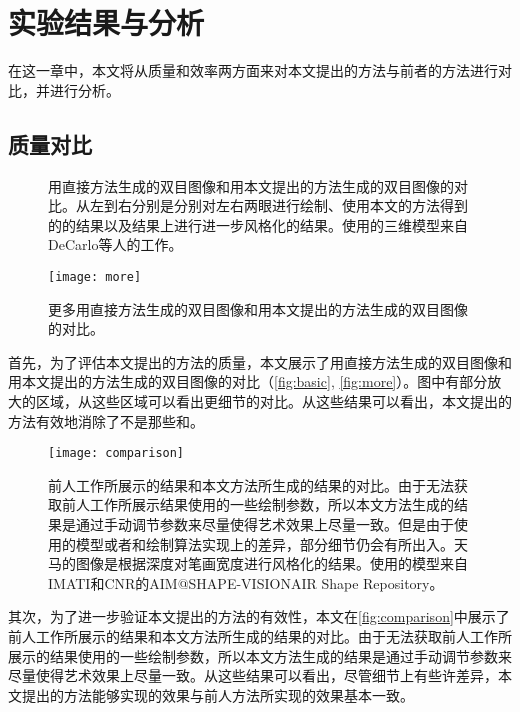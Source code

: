 \chapter{实验结果与分析}

在这一章中，本文将从质量和效率两方面来对本文提出的方法与前者的方法进行对比，并进行分析。

\section{质量对比}

\begin{figure}[tbh]
    \centering
    \caption[与直接方法的双目图像的对比]{\label{fig:basic}
    用直接方法生成的双目图像和用本文提出的方法生成的双目图像的对比。从左到右分别是分别对左右两眼进行绘制、使用本文的方法得到的\stc{}的结果以及\stc{}结果上进行进一步风格化的结果。使用的三维模型来自DeCarlo等人的工作\cite{DFRS03}。
    }
\end{figure}
  
\begin{figure}[tbh]
    \centering
    \texttt{[image: more]}
    \caption[更多与直接方法的双目图像的对比]{\label{fig:more}
    更多用直接方法生成的双目图像和用本文提出的方法生成的双目图像的对比。
    }
\end{figure}

首先，为了评估本文提出的方法的质量，本文展示了用直接方法生成的双目图像和用本文提出的方法生成的双目图像的对比（\autoref{fig:basic}, \autoref{fig:more}）。图中有部分放大的区域，从这些区域可以看出更细节的对比。从这些结果可以看出，本文提出的方法有效地消除了不是\stc{}那些\con{}和\scon{}。

\begin{figure}[tbh]
    \centering
    \texttt{[image: comparison]}
    \caption[与前人工作的双目图像的对比]{\label{fig:comparison}
    前人工作\cite{kim2013stereoscopic,bukenberger2018stereo}所展示的结果和本文方法所生成的结果的对比。由于无法获取前人工作所展示结果使用的一些绘制参数，所以本文方法生成的结果是通过手动调节参数来尽量使得艺术效果上尽量一致。但是由于使用的模型或者\con{}和\scon{}绘制算法实现上的差异，部分细节仍会有所出入。天马的图像是根据深度对笔画宽度进行风格化的结果。使用的模型来自IMATI和CNR的AIM@SHAPE-VISIONAIR Shape Repository\cite{INR04}。}
\end{figure}  

其次，为了进一步验证本文提出的方法的有效性，本文在\autoref{fig:comparison}中展示了前人工作\cite{kim2013stereoscopic,bukenberger2018stereo}所展示的结果和本文方法所生成的结果的对比。由于无法获取前人工作所展示的结果使用的一些绘制参数，所以本文方法生成的结果是通过手动调节参数来尽量使得艺术效果上尽量一致。从这些结果可以看出，尽管细节上有些许差异，本文提出的方法能够实现的\stcy{}效果与前人方法所实现的效果基本一致。

